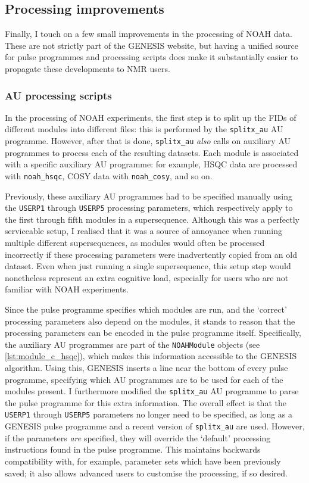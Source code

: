 \subsection{Processing improvements}
\label{subsec:noah__genesis_processing}

Finally, I touch on a few small improvements in the processing of NOAH data.
These are not strictly part of the GENESIS website, but having a unified source for pulse programmes and processing scripts does make it substantially easier to propagate these developments to NMR users.


\subsubsection{AU processing scripts}

In the processing of NOAH experiments, the first step is to split up the FIDs of different modules into different files: this is performed by the \texttt{splitx\_au} AU programme.
However, after that is done, \texttt{splitx\_au} \textit{also} calls on auxiliary AU programmes to process each of the resulting datasets.
Each module is associated with a specific auxiliary AU programme: for example, HSQC data are processed with \texttt{noah\_hsqc}, COSY data with \texttt{noah\_cosy}, and so on.

Previously, these auxiliary AU programmes had to be specified manually using the \texttt{USERP1} through \texttt{USERP5} processing parameters, which respectively apply to the first through fifth modules in a supersequence.
Although this was a perfectly serviceable setup, I realised that it was a source of annoyance when running multiple different supersequences, as modules would often be processed incorrectly if these processing parameters were inadvertently copied from an old dataset.
Even when just running a single supersequence, this setup step would nonetheless represent an extra cognitive load, especially for users who are not familiar with NOAH experiments.

Since the pulse programme specifies which modules are run, and the `correct' processing parameters also depend on the modules, it stands to reason that the processing parameters can be encoded in the pulse programme itself.
Specifically, the auxiliary AU programmes are part of the \texttt{NOAHModule} objects (see \cref{lst:module_c_hsqc}), which makes this information accessible to the GENESIS algorithm.
Using this, GENESIS inserts a line near the bottom of every pulse programme, specifying which AU programmes are to be used for each of the modules present.
I furthermore modified the \texttt{splitx\_au} AU programme to parse the pulse programme for this extra information.
The overall effect is that the \texttt{USERP1} through \texttt{USERP5} parameters no longer need to be specified, as long as a GENESIS pulse programme and a recent version of \texttt{splitx\_au} are used.
However, if the parameters \textit{are} specified, they will override the `default' processing instructions found in the pulse programme.
This maintains backwards compatibility with, for example, parameter sets which have been previously saved; it also allows advanced users to customise the processing, if so desired.


